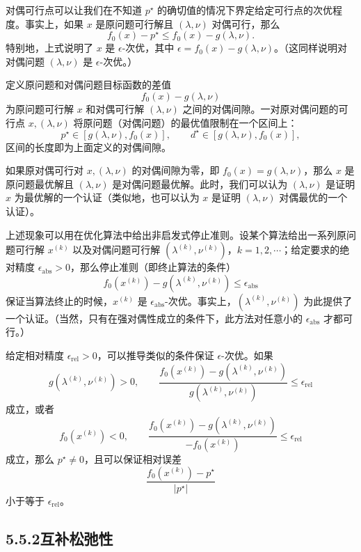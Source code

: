 \documentclass[UTF8,12pt,a4paper,fontset=fandol]{ctexart}
\begin{document}
对偶可行点可以让我们在不知道 $p^\star$ 的确切值的情况下界定给定可行点的次优程度。事实上，如果 $x$ 是原问题可行解且 $(\lambda,\nu)$ 对偶可行，那么
\[
f_0(x)-p^\star\leq f_0(x)-g(\lambda,\nu).
\]
特别地，上式说明了 $x$ 是 $\epsilon$-次优，其中 $\epsilon=f_0(x)-g(\lambda,\nu)$。（这同样说明对对偶问题 $(\lambda,\nu)$ 是 $\epsilon$-次优。）

定义原问题和对偶问题目标函数的差值
\[
f_0(x)-g(\lambda,\nu)
\]
为原问题可行解 $x$ 和对偶可行解 $(\lambda,\nu)$ 之间的对偶间隙。一对原对偶问题的可行点 $x,(\lambda,\nu)$ 将原问题（对偶问题）的最优值限制在一个区间上：
\[
p^\star\in[g(\lambda,\nu),f_0(x)],\qquad
d^\star\in[g(\lambda,\nu),f_0(x)],
\]
区间的长度即为上面定义的对偶间隙。

如果原对偶可行对 $x,(\lambda,\nu)$ 的对偶间隙为零，即 $f_0(x)=g(\lambda,\nu)$，那么 $x$ 是原问题最优解且 $(\lambda,\nu)$ 是对偶问题最优解。此时，我们可以认为 $(\lambda,\nu)$ 是证明 $x$ 为最优解的一个认证（类似地，也可以认为 $x$ 是证明 $(\lambda,\nu)$ 对偶最优的一个认证）。

上述现象可以用在优化算法中给出非启发式停止准则。设某个算法给出一系列原问题可行解 $x^{(k)}$ 以及对偶问题可行解 $(\lambda^{(k)},\nu^{(k)})$，$k=1,2,\cdots$；给定要求的绝对精度 $\epsilon_{\mathrm{abs}}>0$，那么停止准则（即终止算法的条件）
\[
f_0(x^{(k)})-g(\lambda^{(k)},\nu^{(k)})\leq \epsilon_{\mathrm{abs}}
\]
保证当算法终止的时候，$x^{(k)}$ 是 $\epsilon_{\mathrm{abs}}$-次优。事实上，$(\lambda^{(k)},\nu^{(k)})$ 为此提供了一个认证。（当然，只有在强对偶性成立的条件下，此方法对任意小的 $\epsilon_{\mathrm{abs}}$ 才都可行。）

给定相对精度 $\epsilon_{\mathrm{rel}}>0$，可以推导类似的条件保证 $\epsilon$-次优。如果
\[
g(\lambda^{(k)},\nu^{(k)})>0,\qquad
\frac{f_0(x^{(k)})-g(\lambda^{(k)},\nu^{(k)})}{g(\lambda^{(k)},\nu^{(k)})}\leq \epsilon_{\mathrm{rel}}
\]
成立，或者
\[
f_0(x^{(k)})<0,\qquad
\frac{f_0(x^{(k)})-g(\lambda^{(k)},\nu^{(k)})}{-f_0(x^{(k)})}\leq \epsilon_{\mathrm{rel}}
\]
成立，那么 $p^\star\neq 0$，且可以保证相对误差
\[
\frac{f_0(x^{(k)})-p^\star}{|p^\star|}
\]
小于等于 $\epsilon_{\mathrm{rel}}$。

\subsection*{5.5.2\quad 互补松弛性}
\end{document}
